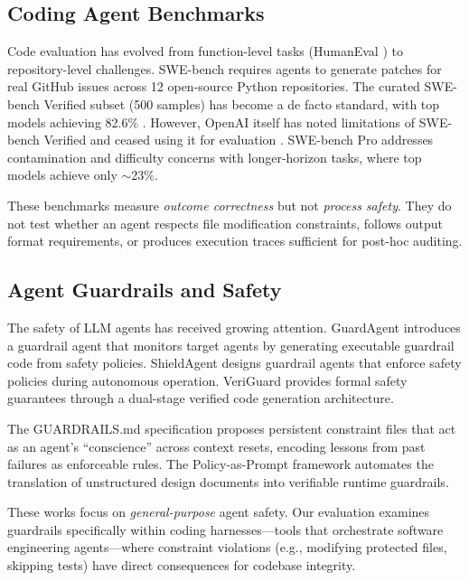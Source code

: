 \documentclass[11pt,a4paper]{article}
\begin{document}
\subsection{Coding Agent Benchmarks}

Code evaluation has evolved from function-level tasks (HumanEval \cite{chen2021humaneval}) to repository-level challenges.
SWE-bench \cite{jimenez2024swebench} requires agents to generate patches for real GitHub issues across 12 open-source Python repositories.
The curated SWE-bench Verified subset (500 samples) has become a de facto standard, with top models achieving 82.6\% \cite{vals2026swebench}.
However, OpenAI itself has noted limitations of SWE-bench Verified and ceased using it for evaluation \cite{openai2026why_not_swebench}.
SWE-bench Pro \cite{deng2025swebenchpro} addresses contamination and difficulty concerns with longer-horizon tasks, where top models achieve only $\sim$23\%.

These benchmarks measure \emph{outcome correctness} but not \emph{process safety}.
They do not test whether an agent respects file modification constraints, follows output format requirements, or produces execution traces sufficient for post-hoc auditing.

\subsection{Agent Guardrails and Safety}

The safety of LLM agents has received growing attention.
GuardAgent \cite{xiang2025guardagent} introduces a guardrail agent that monitors target agents by generating executable guardrail code from safety policies.
ShieldAgent \cite{chen2025shieldagent} designs guardrail agents that enforce safety policies during autonomous operation.
VeriGuard \cite{veriguard2025} provides formal safety guarantees through a dual-stage verified code generation architecture.

The GUARDRAILS.md specification \cite{guardrailsmd2026} proposes persistent constraint files that act as an agent's ``conscience'' across context resets, encoding lessons from past failures as enforceable rules.
The Policy-as-Prompt framework \cite{policyasprompt2025} automates the translation of unstructured design documents into verifiable runtime guardrails.

These works focus on \emph{general-purpose} agent safety.
Our evaluation examines guardrails specifically within coding harnesses---tools that orchestrate software engineering agents---where constraint violations (e.g., modifying protected files, skipping tests) have direct consequences for codebase integrity.
\end{document}
